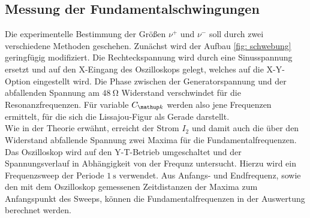 \subsection{Messung der Fundamentalschwingungen}
Die experimentelle Bestimmung der Größen $\nu^+$ und $\nu^-$ soll durch zwei verschiedene Methoden geschehen. Zunächst wird der Aufbau \ref{fig: schwebung}
geringfügig modifiziert. Die Rechteckspannung wird durch eine Sinusspannung ersetzt und auf den X-Eingang des Oszilloskops gelegt, welches auf die X-Y-Option
eingestellt wird. Die Phase zwischen der Generatorspannung und der abfallenden Spannung am $\SI{48}{\ohm}$ Widerstand verschwindet für die Resonanzfrequenzen.
Für variable $C\ua{k}$ werden also jene Frequenzen ermittelt, für die sich die Lissajou-Figur als Gerade darstellt.\\
Wie in der Theorie erwähnt, erreicht der Strom $I_2$ und damit auch die über den Widerstand abfallende Spannung zwei Maxima für die Fundamentalfrequenzen.
Das Oszilloskop wird auf den Y-T-Betrieb umgeschaltet und der Spannungsverlauf in Abhängigkeit von der Frequnz untersucht. Hierzu wird ein Frequenzsweep
der Periode $\SI{1}{\second}$ verwendet. Aus Anfangs- und Endfrequenz, sowie den mit dem Oszilloskop gemessenen Zeitdistanzen der Maxima zum Anfangspunkt
des Sweeps, können die Fundamentalfrequenzen in der Auswertung berechnet werden.
